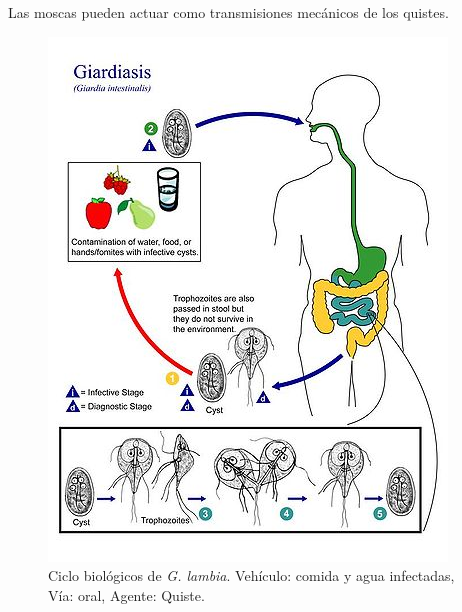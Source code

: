 Las moscas pueden actuar como transmisiones mecánicos de los quistes.
\begin{multicols}{2}
	\begin{figure}[H]
		\centering
		\includegraphics[width=0.895\columnwidth]{A.imagenes/ACV-BioSan-Parasit-GlambiaCBios}
		\caption[Ciclo biológico de \textit{G. lambia}]{Ciclo biológicos de \textit{G. lambia}. Vehículo: comida y agua infectadas, Vía: oral, Agente: Quiste.\label{fig:PARASIT:GLambiaCBios}}
	\end{figure}
	\columnbreak
	\begin{figure}[H]
		\centering

\end{figure}
\end{multicols}
